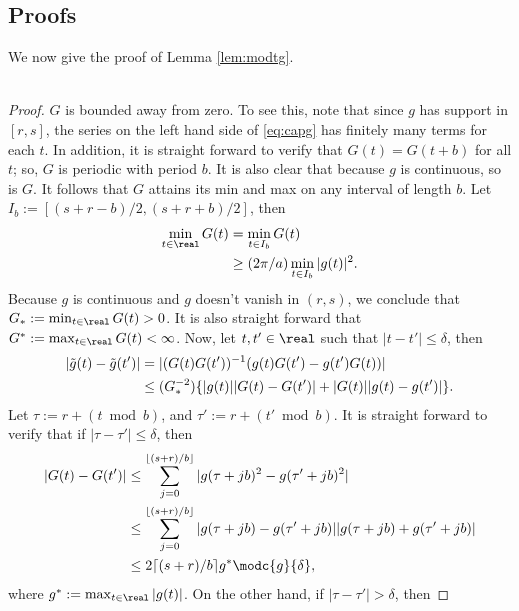 \begin{appendices}
  \chapter{Proofs}\label{ap:proof}
  We now give the proof of Lemma \eqref{lem:modtg}. \\ \\
  \begin{proof}
   $G$ is bounded away from zero. To see this, note that since $g$ has support in  $[r,s]$, the series on the left hand side of \eqref{eq:capg} has finitely many terms for each $t$.  In addition, it is straight forward to verify that $G(t) = G(t+b)$ for all $t$; so,  $G$ is periodic with period $b$. It is also clear that because $g$ is continuous, so is $G$. It follows that $G$ attains its min and max on any interval of length $b$. Let $I_b := [(s+r -b)/2, (s+r +b)/2]$, then
  \begin{align}
    \min_{t\in\real} G(t) &=  \min_{t \in I_b} G(t) \notag\\
    & \ge (2\pi/a) \min_{t \in I_b}\vert g(t)\vert^2.\notag
    \label{}
  \end{align}  
  Because $g$ is continuous and $g$ doesn't vanish in $(r,s)$, we conclude that $G_*:=\min_{t \in \real}G(t) > 0$. It is also straight forward that $G^* := \max_{t \in \real}G(t) < \infty$. Now, let $t, t' \in \real$ such that $\vert t - t' \vert \le \delta$, then 
  \begin{align}
    \vert \tilde{g}(t) - \tilde{g}(t')\vert & = \vert (G(t)G(t'))^{-1}(g(t)G(t') - g(t')G(t))\vert  \notag\\
    & \le (G_*^{-2})\{\vert g(t)\vert \vert G(t) - G(t') \vert + \vert G(t)\vert \vert g(t) - g(t')\vert\}. 
    \label{eq:difftg}
  \end{align}
Let $\tau := r +  (t \bmod {b})$, and $\tau':=r + (t' \bmod{b})$. It is straight forward to verify that if  $\vert \tau - \tau' \vert \le \delta$, then
\begin{align}
  \vert G(t) - G(t') \vert & \le  \sum_{j = 0}^{\lfloor (s + r)/b \rfloor} \vert g(\tau + j b)^2 - g(\tau' + j b)^2\vert\notag\\
  & \le \sum_{j = 0}^{\lfloor (s + r)/b \rfloor} \vert g(\tau + j b) - g(\tau' + j b) \vert \vert g(\tau + j b) + g(\tau' + j b)\vert\notag\\
  & \le 2 \lceil (s + r)/b\rceil g^*\modc{g}{\delta},
  \label{}
\end{align}
where $g^* := \max_{t \in \real} \vert g(t)\vert $. On the other hand, if $\vert \tau - \tau'\vert > \delta$, then 

\end{proof}
\end{appendices}
